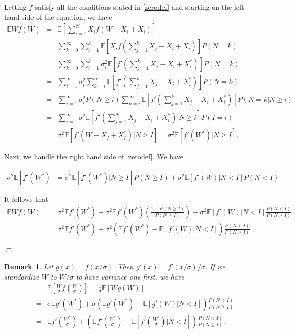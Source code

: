 \documentclass[pdflatex,sn-mathphys-ay]{sn-jnl}
\newcommand{\bea}{\begin{eqnarray}}
\newcommand{\ena}{\end{eqnarray}}
\newcommand{\beas}{\begin{eqnarray*}}
\newcommand{\enas}{\end{eqnarray*}}
\newcommand{\bbox}{\hfill $\Box$}
\newcommand{\nn}{\nonumber}
\newcommand{\E}{\mathbb{E}}
\newtheorem{remark}[theorem]{Remark}
\theoremstyle{thmstyleone}%
\theoremstyle{thmstyletwo}%
\newtheorem{remark}{Remark}%
\theoremstyle{thmstylethree}%
\begin{document}
\proof
Letting $f$ satisfy all the conditions stated in \eqref{zerodef} and starting on the left hand side of the equation, we have
\beas
\E Wf(W) &=& \E \left[\sum_{i=1}^N X_i f(W-X_i+X_i)\right] \\
&=& \sum_{k=0}^\infty \sum_{i=1}^k\E\left[ X_i f\left(\sum_{j=1}^kX_j-X_i+X_i\right)\right] P(N=k) \\
&=& \sum_{k=0}^\infty \sum_{i=1}^k \sigma_i^2 \E\left[ f'\left(\sum_{j=1}^kX_j-X_i+X_i^*\right)\right] P(N=k)  \\
&=& \sum_{i=1}^\infty \sigma_i^2 \sum_{k=i}^\infty \E\left[  f'\left(\sum_{j=1}^kX_j-X_i+X_i^*\right)\right] P(N=k) \\
&=& \sum_{i=1}^\infty \sigma_i^2 P(N\ge i) \sum_{k=i}^\infty \E\left[  f'\left(\sum_{j=1}^kX_j-X_i+X_i^*\right)\right] P(N=k|N\ge i) \\
&=& \sum_{i=1}^\infty \sigma^2  \E\left[  f'\left(\sum_{j=1}^NX_j-X_i+X_i^*\right)\Bigg|N\ge i\right]P(I=i)  \\
&=& \sigma^2 \E\left[f'(W-X_I+X_I^*)|N\ge I\right] = \sigma^2 \E\left[f'(W^*)|N\ge I\right].
\enas

Next, we handle the right hand side of \eqref{zerodef}. We have

\beas
\sigma^2\E[f'(W^*)] = \sigma^2\E\left[f'(W^*)|N\ge I\right]P(N\ge I)+\sigma^2\E\left[f'(W)|N< I\right]P(N< I)
\enas

It follows that
\beas
\E Wf(W) &=& \sigma^2\E f'(W^*) + \sigma^2\E f'(W^*)\left(\frac{1-P(N\ge I)}{P(N\ge I)}\right)-\sigma^2\E[f'(W)|N<I]\frac{P(N<I)}{P(N\ge I)} \\
&=&  \sigma^2\E f'(W^*) + \sigma^2\left(\E f'(W^*)-\E[f'(W)|N<I]\right)\frac{P(N<I)}{P(N\ge I)} .
\enas

\bbox



\begin{remark}
	Let $g(x) = f(x/\sigma)$. Then $g'(x) = f'(x/\sigma)/\sigma$. If we standardize $W$ to $W/\sigma$ to have variance one first, we have
	\bea \label{approxzero2}
	&& \E\left[\frac{W}{\sigma}f\left(\frac{W}{\sigma}\right)\right] = \frac{1}{\sigma}\E[Wg(W)] \nn \\ 
	&=& \sigma \E g'(W^*) + \sigma(\E g'(W^*)-\E[g'(W)|N<I])\frac{P(N<I)}{P(N\ge I)} \nn\\
	&=&  \E f'\left(\frac{W^*}{\sigma}\right) + \left(\E f'\left(\frac{W^*}{\sigma}\right) -\E \left[f'\left(\frac{W^*}{\sigma}\right) \Big|N<I \right]\right) \frac{P(N<I)}{P(N\ge I)} .
	\ena
\end{remark}
\end{document}
